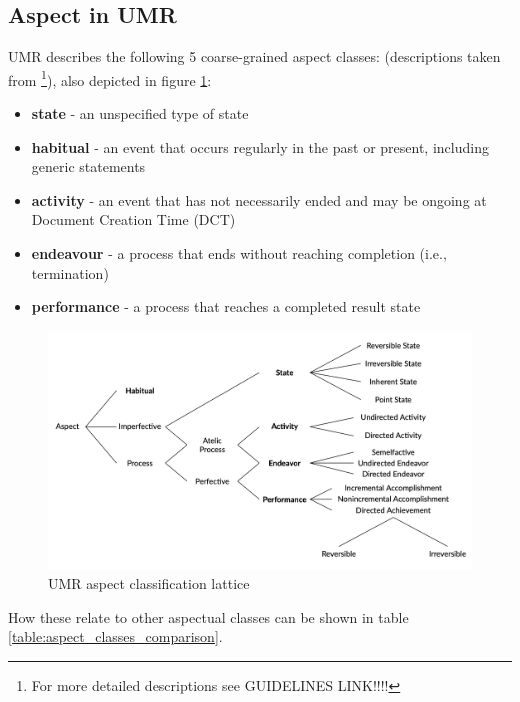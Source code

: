 \subsection*{Aspect in UMR}
\label{aspect_in_umr}
UMR describes the following 5 coarse-grained aspect classes: (descriptions taken from \citet{umr}\footnote{For more detailed descriptions see GUIDELINES LINK!!!!}), also depicted in figure \ref{fig:umr_aspect_tree}:
\begin{itemize}
    \item \textbf{state} - an unspecified type of state
    \item \textbf{habitual} - an event that occurs regularly in the past or
    present, including generic statements
    \item \textbf{activity} - an event that has not necessarily ended and may
    be ongoing at Document Creation Time (DCT)
    \item \textbf{endeavour} - a process that ends without reaching completion
    (i.e., termination)
    \item \textbf{performance} - a process that reaches a completed result
    state
\end{itemize}

\begin{figure}
    \includegraphics[width=\textwidth]{img/umr_aspct_tree.png}
    \caption{UMR aspect classification lattice \citep{umrslides2022}}
    \label{fig:umr_aspect_tree}
\end{figure}

How these relate to other aspectual classes can be shown in table \ref{table:aspect_classes_comparison}.

